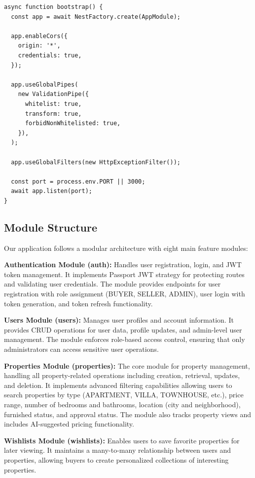 \begin{verbatim}
async function bootstrap() {
  const app = await NestFactory.create(AppModule);
  
  app.enableCors({
    origin: '*',
    credentials: true,
  });
  
  app.useGlobalPipes(
    new ValidationPipe({
      whitelist: true,
      transform: true,
      forbidNonWhitelisted: true,
    }),
  );
  
  app.useGlobalFilters(new HttpExceptionFilter());
  
  const port = process.env.PORT || 3000;
  await app.listen(port);
}
\end{verbatim}

\subsection{Module Structure}

Our application follows a modular architecture with eight main feature modules:

\textbf{Authentication Module (auth):} Handles user registration, login, and JWT token management. It implements Passport JWT strategy for protecting routes and validating user credentials. The module provides endpoints for user registration with role assignment (BUYER, SELLER, ADMIN), user login with token generation, and token refresh functionality.

\textbf{Users Module (users):} Manages user profiles and account information. It provides CRUD operations for user data, profile updates, and admin-level user management. The module enforces role-based access control, ensuring that only administrators can access sensitive user operations.

\textbf{Properties Module (properties):} The core module for property management, handling all property-related operations including creation, retrieval, updates, and deletion. It implements advanced filtering capabilities allowing users to search properties by type (APARTMENT, VILLA, TOWNHOUSE, etc.), price range, number of bedrooms and bathrooms, location (city and neighborhood), furnished status, and approval status. The module also tracks property views and includes AI-suggested pricing functionality.

\textbf{Wishlists Module (wishlists):} Enables users to save favorite properties for later viewing. It maintains a many-to-many relationship between users and properties, allowing buyers to create personalized collections of interesting properties.

